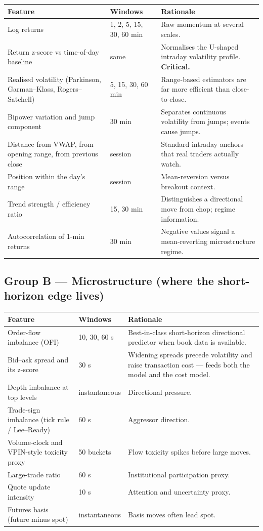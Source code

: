 \begin{longtable}{@{}p{4.6cm}p{4.0cm}p{5.6cm}@{}}
\toprule
\textbf{Feature} & \textbf{Windows} & \textbf{Rationale}\\
\midrule
Log returns & 1, 2, 5, 15, 30, 60 min & Raw momentum at several scales.\\
Return z-score vs time-of-day baseline & same & Normalises the U-shaped
intraday volatility profile. \textbf{Critical.}\\
Realised volatility (Parkinson, Garman--Klass, Rogers--Satchell) & 5, 15, 30, 60
min & Range-based estimators are far more efficient than close-to-close.\\
Bipower variation and jump component & 30 min & Separates continuous
volatility from jumps; events cause jumps.\\
Distance from VWAP, from opening range, from previous close & session & Standard
intraday anchors that real traders actually watch.\\
Position within the day's range & session & Mean-reversion versus breakout
context.\\
Trend strength / efficiency ratio & 15, 30 min & Distinguishes a directional
move from chop; regime information.\\
Autocorrelation of 1-min returns & 30 min & Negative values signal a
mean-reverting microstructure regime.\\
\bottomrule
\end{longtable}

\subsection{Group B --- Microstructure (where the short-horizon edge lives)}

\begin{longtable}{@{}p{4.6cm}p{4.0cm}p{5.6cm}@{}}
\toprule
\textbf{Feature} & \textbf{Windows} & \textbf{Rationale}\\
\midrule
Order-flow imbalance (OFI) & 10, 30, 60 s & Best-in-class short-horizon
directional predictor when book data is available.\\
Bid--ask spread and its z-score & 30 s & Widening spreads precede volatility and
raise transaction cost --- feeds both the model and the cost model.\\
Depth imbalance at top levels & instantaneous & Directional pressure.\\
Trade-sign imbalance (tick rule / Lee--Ready) & 60 s & Aggressor direction.\\
Volume-clock and VPIN-style toxicity proxy & 50 buckets & Flow toxicity spikes
before large moves.\\
Large-trade ratio & 60 s & Institutional participation proxy.\\
Quote update intensity & 10 s & Attention and uncertainty proxy.\\
Futures basis (future minus spot) & instantaneous & Basis moves often lead spot.\\
\bottomrule
\end{longtable}

